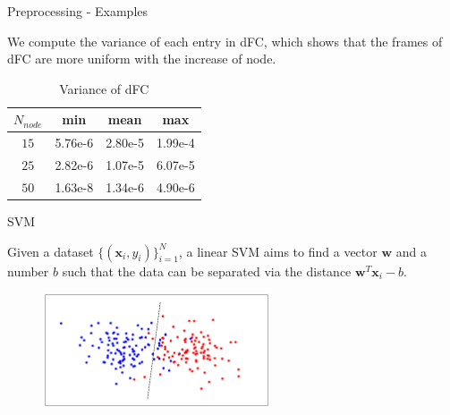 \documentclass{beamer}
\begin{document}
\begin{frame}{Preprocessing - Examples}

    We compute the variance of each entry in dFC, which shows that the frames of dFC are more uniform with the increase of node.

    \begin{table}[H]
        \centering
        \begin{tabular}{|c|c|c|c|}
            \hline
            $N_{node}$ & min     & mean    & max     \\
            \hline
            $15$       & 5.76e-6 & 2.80e-5 & 1.99e-4 \\
            \hline
            $25$       & 2.82e-6 & 1.07e-5 & 6.07e-5 \\
            \hline
            $50$       & 1.63e-8 & 1.34e-6 & 4.90e-6 \\
            \hline
        \end{tabular}
        \caption{Variance of dFC}
    \end{table}

\end{frame}




\begin{frame}{SVM}

    Given a dataset $\{ (\mathbf{x}_i, y_i) \}_{i=1}^N$, a linear SVM aims to find a vector $\mathbf{w}$ and a number $b$ such that the data can be separated via the distance $\mathbf{w}^T \mathbf{x}_i - b$.

    \begin{figure}[H]
        \centering
        \includegraphics[width=0.6\textwidth]{./figure/svm.jpg}
    \end{figure}

\end{frame}
\end{document}
